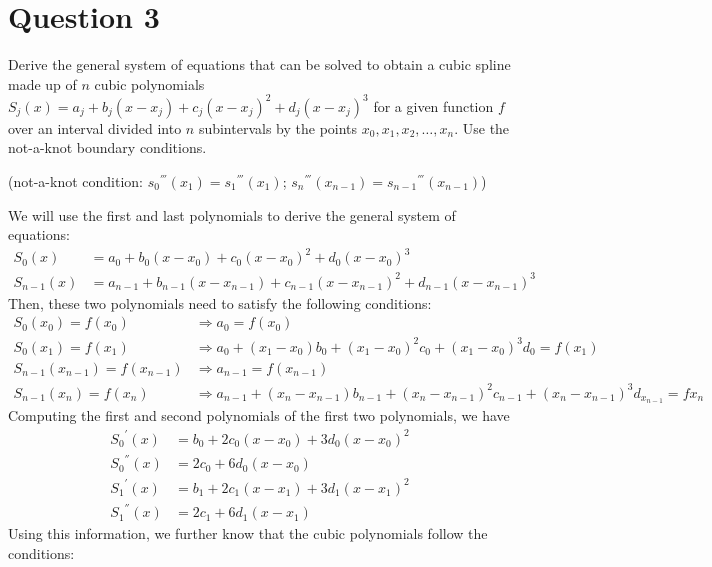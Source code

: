 \section{Question 3}

\begin{question}
    Derive the general system of equations that can be solved to obtain a cubic spline made up of $n$ cubic polynomials $S_j(x) = a_j+b_j(x-x_j)+c_j(x-x_j)^2+d_j(x-x_j)^3$ for a given function $f$ over an interval divided into $n$ subintervals by the points $x_0, x_1, x_2, \dots, x_n$. Use the not-a-knot boundary conditions.
    
    (not-a-knot condition: ${s_0}^{'''}(x_1) = {s_1}^{'''}(x_1)$; ${s_n}^{'''}(x_{n-1}) = {s_{n-1}}^{'''}(x_{n-1})$)
\end{question}

\begin{answer}
    We will use the first and last polynomials to derive the general system of equations:
    \begin{align}
        S_0(x) &= a_0 + b_0(x-x_0) + c_0(x-x_0)^2 + d_0(x-x_0)^3\\
        S_{n-1}(x) &= a_{n-1} + b_{n-1}(x-x_{n-1}) + c_{n-1}(x-x_{n-1})^2 + d_{n-1}(x-x_{n-1})^3
    \end{align}
    Then, these two polynomials need to satisfy the following conditions:
    \begin{align}
        S_0(x_0) = f(x_0) &\Rightarrow a_0 = f(x_0)\\
        S_0(x_1) = f(x_1) &\Rightarrow a_0 + (x_1-x_0)b_0 + {(x_1-x_0)}^2c_0 + {(x_1-x_0)}^3d_0 = f(x_1)\\
        S_{n-1}(x_{n-1}) = f(x_{n-1}) &\Rightarrow a_{n-1} = f({x_{n-1}})\\
        S_{n-1}(x_n) = f(x_n) &\Rightarrow a_{n-1} + (x_n - x_{n-1})b_{n-1} + {(x_n-x_{n-1})}^2c_{n-1} + {(x_n - x_{n-1})}^3d_{x_{n-1}} = f{x_n}
    \end{align}
    Computing the first and second polynomials of the first two polynomials, we have
    \begin{align}
        {S_0}^{'}(x) &= b_0 + 2c_0(x-x_0) + 3d_0(x-x_0)^2\\
        {S_0}^{''}(x) &= 2c_0 + 6d_0(x-x_0)\\
        {S_1}^{'}(x) &= b_1 + 2c_1(x-x_1) + 3d_1(x-x_1)^2\\
        {S_1}^{''}(x) &= 2c_1 + 6d_1(x-x_1)
    \end{align}
    Using this information, we further know that the cubic polynomials follow the conditions:

\end{answer}
